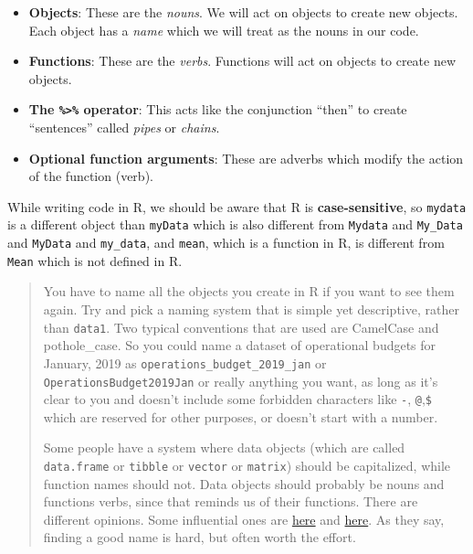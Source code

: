 \documentclass[12pt,letterpaperpaper,openany]{book}
\providecommand{\tightlist}{%
  \setlength{\itemsep}{0pt}\setlength{\parskip}{0pt}}
\begin{document}
\begin{itemize}
\tightlist
\item
  \textbf{Objects}: These are the \emph{nouns}. We will act on objects to create new objects. Each object has a \emph{name} which we will treat as the nouns in our code.
\item
  \textbf{Functions}: These are the \emph{verbs}. Functions will act on objects to create new objects.
\item
  \textbf{The \texttt{\%\textgreater{}\%} operator}: This acts like the conjunction ``then'' to create ``sentences'' called \emph{pipes} or \emph{chains}.
\item
  \textbf{Optional function arguments}: These are adverbs which modify the action of the function (verb).
\end{itemize}

While writing code in R, we should be aware that R is \textbf{case-sensitive}, so \texttt{mydata} is a different object
than \texttt{myData} which is also different from \texttt{Mydata} and \texttt{My\_Data} and \texttt{MyData} and \texttt{my\_data}, and \texttt{mean}, which is a function in R, is different from \texttt{Mean} which is not defined in R.

\begin{quote}
You have to name all the objects you create in R if you want to see them again. Try and pick a
naming system that is simple yet descriptive, rather than \texttt{data1}. Two typical conventions that are used
are CamelCase and pothole\_case. So you could name a dataset of operational budgets for January, 2019 as
\texttt{operations\_budget\_2019\_jan} or \texttt{OperationsBudget2019Jan} or really anything you want, as long as it's
clear to you and doesn't include some forbidden characters like \texttt{-}, \texttt{@},\texttt{\$} which are reserved for
other purposes, or doesn't start with a number.

Some people have a system where data objects (which are called \texttt{data.frame} or \texttt{tibble} or \texttt{vector} or \texttt{matrix}) should be
capitalized, while function names should not. Data objects should probably be nouns and functions verbs, since that reminds us of their functions. There are different opinions. Some influential ones are
\href{http://adv-r.had.co.nz/Style.html}{here} and \href{https://google.github.io/styleguide/Rguide.xml}{here}. As they say, finding a good name is hard, but often worth the effort.
\end{quote}
\end{document}
